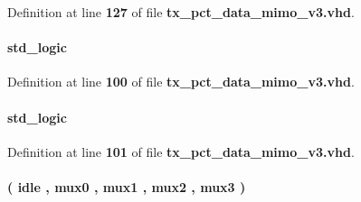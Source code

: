 Definition at line {\bf 127} of file {\bf tx\+\_\+pct\+\_\+data\+\_\+mimo\+\_\+v3.\+vhd}.

\paragraph[{iq\+\_\+sel}]{ {\bfseries \textcolor{comment}{std\+\_\+logic}\textcolor{vhdlchar}{ }} \hspace{0.3cm}{\ttfamily [Signal]}}\label{classtx__pct__data__mimo__v3_1_1arch_af706125a169a27839f0c0c204f99823a}


Definition at line {\bf 100} of file {\bf tx\+\_\+pct\+\_\+data\+\_\+mimo\+\_\+v3.\+vhd}.

\paragraph[{iq\+\_\+sel\+\_\+sig}]{ {\bfseries \textcolor{comment}{std\+\_\+logic}\textcolor{vhdlchar}{ }} \hspace{0.3cm}{\ttfamily [Signal]}}\label{classtx__pct__data__mimo__v3_1_1arch_a97b7b9cf9fbc00b946142dc85711c848}


Definition at line {\bf 101} of file {\bf tx\+\_\+pct\+\_\+data\+\_\+mimo\+\_\+v3.\+vhd}.

\paragraph[{mux\+\_\+state}]{ {\bfseries \textcolor{vhdlchar}{(}\textcolor{vhdlchar}{ }\textcolor{vhdlchar}{idle}\textcolor{vhdlchar}{ }\textcolor{vhdlchar}{,}\textcolor{vhdlchar}{ }\textcolor{vhdlchar}{mux0}\textcolor{vhdlchar}{ }\textcolor{vhdlchar}{,}\textcolor{vhdlchar}{ }\textcolor{vhdlchar}{mux1}\textcolor{vhdlchar}{ }\textcolor{vhdlchar}{,}\textcolor{vhdlchar}{ }\textcolor{vhdlchar}{mux2}\textcolor{vhdlchar}{ }\textcolor{vhdlchar}{,}\textcolor{vhdlchar}{ }\textcolor{vhdlchar}{mux3}\textcolor{vhdlchar}{ }\textcolor{vhdlchar}{)}\textcolor{vhdlchar}{ }} \hspace{0.3cm}{\ttfamily [Type]}}\label{classtx__pct__data__mimo__v3_1_1arch_a1f94a18abd1cadfc99811e850b7e0d5e}


